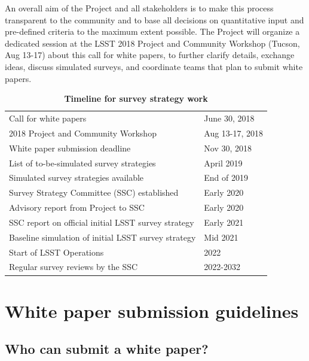 \documentclass[DM,lsstdraft,toc,usenatbib]{lsstdoc}
\begin{document}
An overall aim of the Project and all stakeholders is to make this process transparent to the community and to base 
all decisions on quantitative input and pre-defined criteria to the maximum extent possible. 
The Project will organize a dedicated session at the LSST 2018 Project and Community Workshop (Tucson, Aug 13-17)
about this call for white papers, to further clarify  details, exchange ideas, discuss simulated surveys, 
and coordinate teams that plan to submit white papers. 

\begin{table}[htp]
\caption{\bf{Timeline for survey strategy work}}
\begin{center}
\begin{tabular}{l|l}
Call for white papers & June 30, 2018 \\
2018 Project and Community Workshop & Aug 13-17, 2018 \\
White paper submission deadline & Nov 30, 2018 \\
List of to-be-simulated survey strategies & April 2019 \\
Simulated survey strategies available & End of 2019 \\
Survey Strategy Committee (SSC) established & Early 2020 \\
Advisory report from Project to SSC & Early 2020 \\
SSC report on official initial LSST survey strategy & Early 2021 \\
Baseline simulation of initial LSST survey strategy & Mid 2021 \\
Start of LSST Operations & 2022 \\
Regular survey reviews by the SSC & 2022-2032 \\
\end{tabular}
\end{center}
\end{table}


\section{White paper submission guidelines} 


\subsection{Who can submit a white paper?} 
\end{document}

